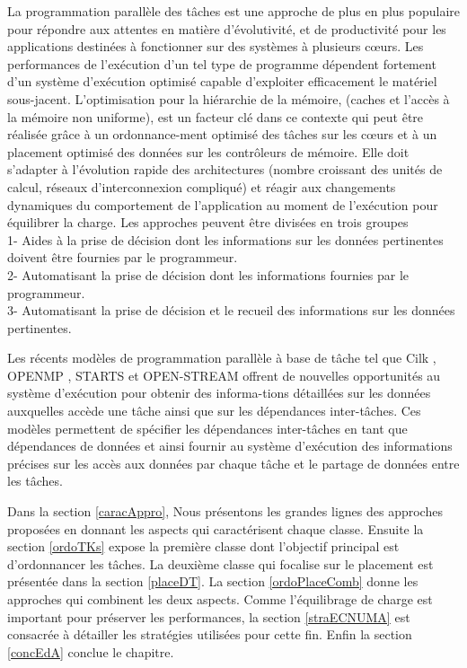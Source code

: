 La programmation parallèle des tâches est une approche de plus en plus populaire pour répondre aux attentes en matière d'évolutivité, et de productivité pour les applications destinées à fonctionner sur des systèmes à plusieurs cœurs. 
Les performances de l'exécution d'un tel type de programme dépendent fortement d'un système d'exécution optimisé capable d'exploiter efficacement le matériel sous-jacent. 
L'optimisation pour la hiérarchie de la mémoire, (caches et l'accès à la mémoire non uniforme), est un facteur clé dans ce contexte 
qui peut être réalisée grâce à un ordonnance-ment optimisé des tâches sur les cœurs et à un placement optimisé des données sur les contrôleurs de mémoire.   
Elle doit s'adapter à l'évolution rapide des architectures (nombre croissant des unités de calcul, réseaux d'interconnexion compliqué) et réagir aux changements dynamiques du comportement de l'application au moment de l'exécution pour équilibrer la charge.
Les approches peuvent être divisées en trois groupes \cite{Dreb15}\\
1- Aides à la prise de décision dont les informations sur les données pertinentes doivent être fournies par le programmeur.\\
2- Automatisant la prise de décision dont les informations fournies par le programmeur.\\
3- Automatisant la prise de décision et le recueil des informations sur les données pertinentes.

Les récents modèles de programmation parallèle à base de tâche tel que Cilk \cite{Cil00} \cite{Cil01}, OPENMP \cite{Omp00} \cite{Omp01} \cite{Omp02}, STARTS \cite{Sta00} et OPEN-STREAM \cite{Ost00} offrent de nouvelles opportunités au système d'exécution pour obtenir des informa-tions détaillées sur les données auxquelles accède une tâche ainsi que sur les dépendances inter-tâches. Ces modèles permettent de spécifier les dépendances inter-tâches en tant que dépendances de données et 
ainsi fournir au système d'exécution des informations précises sur les accès aux données par chaque tâche et le partage de données entre les tâches.

Dans la section \ref{caracAppro}, Nous présentons les grandes lignes des approches proposées en donnant les aspects qui caractérisent chaque classe. 
Ensuite la section \ref{ordoTKs} expose la première classe dont l'objectif principal est d'ordonnancer les tâches.
La deuxième classe qui focalise sur le placement est présentée dans la section \ref{placeDT}.
La section \ref{ordoPlaceComb} donne les approches qui combinent les deux aspects.
Comme l'équilibrage de charge est important pour préserver les performances, la section \ref{straECNUMA} est consacrée à détailler les stratégies utilisées pour cette fin.
Enfin la section \ref{concEdA} conclue le chapitre.\\
